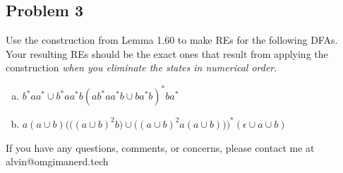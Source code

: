 \documentclass{math}
\begin{document}
\subsection*{Problem 3}
Use the construction from Lemma 1.60 to make REs for the following DFAs. Your
resulting REs should be the exact ones that result from applying the
construction \textit{when you eliminate the states in numerical order}.
\begin{enumerate}[(a)]
  \item \( b^*aa^*\cup b^*aa^*b(ab^*aa^*b\cup ba^*b)^*ba^* \)
  \item \( a(a\cup b)\Bigg(\big((a\cup b)^2b\big)\cup\big((a\cup b)^2a(a\cup b)\big)\Bigg)^*
    (\epsilon\cup a\cup b) \)
\end{enumerate}

\begin{center}
  If you have any questions, comments, or concerns, please contact me at
  alvin@omgimanerd.tech
\end{center}
\end{document}
